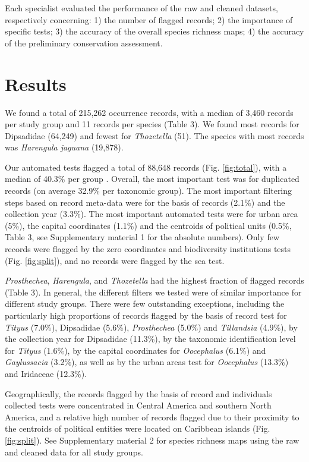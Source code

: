 \documentclass[
  12pt,
]{article}
\begin{document}
Each specialist evaluated the performance of the raw and cleaned datasets, respectively concerning: 1) the number of flagged records; 2) the importance of specific tests; 3) the accuracy of the overall species richness maps; 4) the accuracy of the preliminary conservation assessment.

\hypertarget{results}{%
\section{Results}\label{results}}

We found a total of 215,262 occurrence records, with a median of 3,460 records per study group and 11 records per species (Table 3). We found most records for Dipsadidae (64,249) and fewest for \emph{Thozetella} (51). The species with most records was \emph{Harengula jaguana} (19,878).

Our automated tests flagged a total of 88,648 records (Fig. \ref{fig:total}), with a median of 40.3\% per group . Overall, the most important test was for duplicated records (on average 32.9\% per taxonomic group). The most important filtering steps based on record meta-data were for the basis of records (2.1\%) and the collection year (3.3\%). The most important automated tests were for urban area (5\%), the capital coordinates (1.1\%) and the centroids of political units (0.5\%, Table 3, see Supplementary material 1 for the absolute numbers). Only few records were flagged by the zero coordinates and biodiversity institutions tests (Fig. \ref{fig:split}), and no records were flagged by the sea test.

\emph{Prosthechea}, \emph{Harengula}, and \emph{Thozetella} had the highest fraction of flagged records (Table 3). In general, the different filters we tested were of similar importance for different study groups. There were few outstanding exceptions, including the particularly high proportions of records flagged by the basis of record test for \emph{Tityus} (7.0\%), Dipsadidae (5.6\%), \emph{Prosthechea} (5.0\%) and \emph{Tillandsia} (4.9\%), by the collection year for Dipsadidae (11.3\%), by the taxonomic identification level for \emph{Tityus} (1.6\%), by the capital coordinates for \emph{Oocephalus} (6.1\%) and \emph{Gaylussacia} (3.2\%), as well as by the urban areas test for \emph{Oocephalus} (13.3\%) and Iridaceae (12.3\%).

Geographically, the records flagged by the basis of record and individuals collected tests were concentrated in Central America and southern North America, and a relative high number of records flagged due to their proximity to the centroids of political entities were located on Caribbean islands (Fig. \ref{fig:split}). See Supplementary material 2 for species richness maps using the raw and cleaned data for all study groups.
\end{document}
